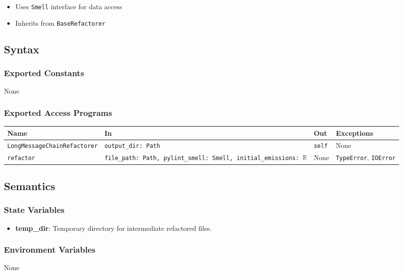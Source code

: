 \documentclass[12pt, titlepage]{article}
\begin{document}
\begin{itemize}
  \item Uses \texttt{Smell} interface for data access
  \item Inherits from \texttt{BaseRefactorer}
\end{itemize}

\subsection{Syntax}

\subsubsection{Exported Constants}
None

\subsubsection{Exported Access Programs}

\begin{center}
\begin{tabularx}{\linewidth}{|l|>{\raggedright\arraybackslash}X|p{1in}|p{1in}|}
\hline
\textbf{Name} & \textbf{In} & \textbf{Out} & \textbf{Exceptions} \\
\hline
\texttt{LongMessageChainRefactorer} & \texttt{output\_dir: Path} & \texttt{self} & None \\
\hline
\texttt{refactor} & \texttt{file\_path: Path, pylint\_smell: Smell, initial\_emissions: $\mathbb{R}$} & None & \texttt{TypeError}, \texttt{IOError} \\
\hline
\end{tabularx}
\end{center}


\subsection{Semantics}

\subsubsection{State Variables}

\begin{itemize}
  \item \textbf{temp\_dir}: Temporary directory for intermediate refactored files.
\end{itemize}

\subsubsection{Environment Variables}
None
\end{document}
